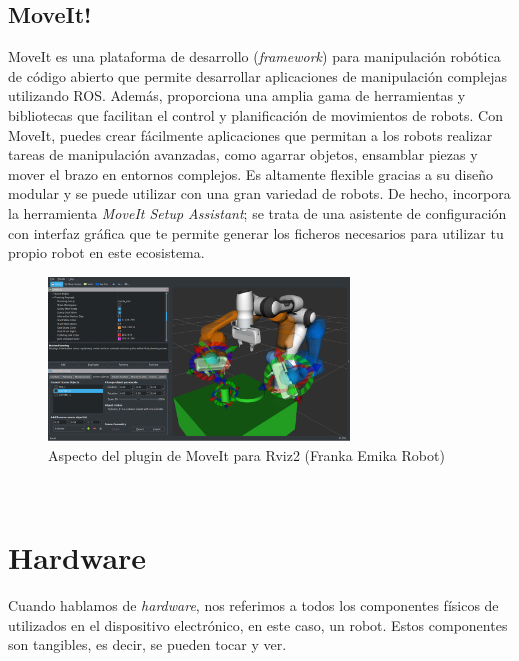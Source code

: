\subsection{MoveIt!}
\label{subsec:moveit}
MoveIt es una plataforma de desarrollo (\textit{framework}) para manipulación robótica de código abierto que permite desarrollar 
aplicaciones de manipulación complejas utilizando ROS. Además, proporciona una amplia gama de herramientas y bibliotecas que 
facilitan el control y planificación de movimientos de robots. Con MoveIt, puedes crear fácilmente aplicaciones que permitan
a los robots realizar tareas de manipulación avanzadas, como agarrar objetos, ensamblar piezas y mover el brazo en entornos complejos. 
Es altamente flexible gracias a su diseño modular y se puede utilizar con una gran variedad de robots. De hecho, incorpora la herramienta 
\textit{MoveIt Setup Assistant}; se trata de una asistente de configuración con interfaz gráfica que te permite generar los ficheros 
necesarios para utilizar tu propio robot en este ecosistema. 
\begin{figure} [h!]
  \begin{center}
    \includegraphics[width=8cm]{figs/moveit_intro.png}
  \end{center}
  \caption{Aspecto del plugin de MoveIt para Rviz2 (Franka Emika Robot)}
  \label{fig:ros2logo}
\end{figure}\ 

\section{Hardware}
\label{sec:hardware}
Cuando hablamos de \textit{hardware}, nos referimos a todos los componentes físicos de utilizados en el dispositivo electrónico, en este caso, un robot. Estos 
componentes son tangibles, es decir, se pueden tocar y ver.

